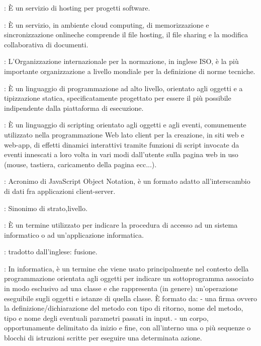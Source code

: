 {		: È un servizio di hosting per progetti software.

		: È un servizio, in ambiente cloud computing, di memorizzazione e sincronizzazione onlineche comprende il file hosting, il file sharing e la modifica collaborativa di documenti.


		: L'Organizzazione internazionale per la normazione, in inglese ISO, è la più importante organizzazione a livello mondiale per la definizione di norme tecniche.		
	
		: È un linguaggio di programmazione ad alto livello, orientato agli oggetti e a tipizzazione statica, specificatamente progettato per essere il più possibile indipendente dalla piattaforma di esecuzione.
	
		: È un linguaggio di scripting orientato agli oggetti e agli eventi, comunemente utilizzato nella programmazione Web lato client per la creazione, in siti web e web-app, di effetti dinamici interattivi tramite funzioni di script invocate da eventi innescati a loro volta in vari modi dall'utente sulla pagina web in uso (mouse, tastiera, caricamento della pagina ecc...).
	
		: Acronimo di JavaScript Object Notation, è un formato adatto all'interscambio di dati fra applicazioni client-server.
	
	
		: Sinonimo di strato,livello.
		
		: È un termine utilizzato per indicare la procedura di accesso ad un sistema informatico o ad un'applicazione informatica.
	
		: tradotto dall'inglese: fusione.
		
		: In informatica, è un termine che viene usato principalmente nel contesto della programmazione orientata agli oggetti per indicare un sottoprogramma associato in modo esclusivo ad una classe e che rappresenta (in genere) un'operazione eseguibile sugli oggetti e istanze di quella classe. È formato da:
- una firma ovvero la definizione/dichiarazione del metodo con tipo di ritorno, nome del metodo, tipo e nome degli eventuali parametri passati in input.
- un corpo, opportunamente delimitato da inizio e fine, con all'interno una o più sequenze o blocchi di istruzioni scritte per eseguire una determinata azione.

}
